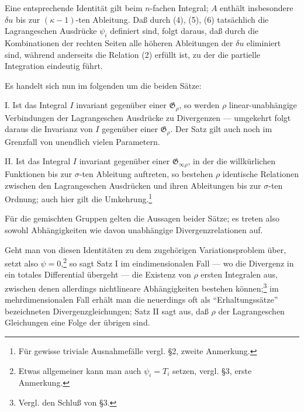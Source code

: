 \documentclass[11pt]{article}
\newcommand{\G}{\mathfrak G}
\begin{document}
Eine entsprechende Identität gilt beim \(n\)-fachen Integral; \(A\) enthält insbesondere \(\delta u\) bis zur \((\kappa-1)\)-ten Ableitung. Daß durch (4), (5), (6) tatsächlich die Lagrangeschen Ausdrücke \(\psi_i\) definiert sind, folgt daraus, daß durch die Kombinationen der rechten Seiten alle höheren Ableitungen der \(\delta u\) eliminiert sind, während anderseits die Relation (2) erfüllt ist, zu der die partielle Integration eindeutig führt.

Es handelt sich nun im folgenden um die beiden Sätze:

I. Ist das Integral \(I\) invariant gegenüber einer \(\G_\rho\), so werden \(\rho\) linear-unabhängige Verbindungen der Lagrangeschen Ausdrücke zu Divergenzen --- umgekehrt folgt daraus die Invarianz von \(I\) gegenüber einer \(\G_\rho\). Der Satz gilt auch noch im Grenzfall von unendlich vielen Parametern.

II. Ist das Integral \(I\) invariant gegenüber einer \(\G_{\infty\rho}\), in der die willkürlichen Funktionen bis zur \(\sigma\)-ten Ableitung auftreten, so bestehen \(\rho\) identische Relationen zwischen den Lagrangeschen Ausdrücken und ihren Ableitungen bis zur \(\sigma\)-ten Ordnung; auch hier gilt die Umkehrung.\footnote{Für gewisse triviale Ausnahmefälle vergl. \S{}2, zweite Anmerkung.}

Für die gemischten Gruppen gelten die Aussagen beider Sätze; es treten also sowohl Abhängigkeiten wie davon unabhängige Divergenzrelationen auf.

Geht man von diesen Identitäten zu dem zugehörigen Variationsproblem über, setzt also \(\psi=0\),\footnote{Etwas allgemeiner kann man auch \(\psi_i=T_i\) setzen, vergl. \S{}3, erste Anmerkung.} so sagt Satz I im eindimensionalen Fall --- wo die Divergenz in ein totales Differential übergeht --- die Existenz von \(\rho\) ersten Integralen aus, zwischen denen allerdings nichtlineare Abhängigkeiten bestehen können;\footnote{Vergl. den Schluß von \S{}3.} im mehrdimensionalen Fall erhält man die neuerdings oft als ``Erhaltungssätze'' bezeichneten Divergenzgleichungen; Satz II sagt aus, daß \(\rho\) der Lagrangeschen Gleichungen eine Folge der übrigen sind.
\end{document}
